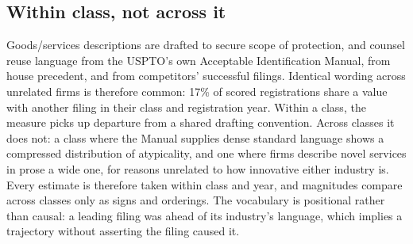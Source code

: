 \subsection{Within class, not across it}

Goods/services descriptions are drafted to secure scope of protection,
and counsel reuse language from the USPTO's own Acceptable
Identification Manual, from house precedent, and from competitors'
successful filings. Identical wording across unrelated firms is
therefore common: 17\% of scored registrations share a value with
another filing in their class and registration year. Within a class, the
measure picks up departure from a shared drafting convention. Across
classes it does not: a class where the Manual supplies dense standard
language shows a compressed distribution of atypicality, and one where
firms describe novel services in prose a wide one, for reasons unrelated
to how innovative either industry is. Every estimate is therefore taken
within class and year, and magnitudes compare across classes only as
signs and orderings. The vocabulary is positional rather than causal: a
leading filing was ahead of its industry's language, which implies a
trajectory without asserting the filing caused it.
